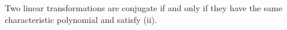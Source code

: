 Two linear transformations are conjugate if and only if they have the same characteristic polynomial and satisfy (ii).
